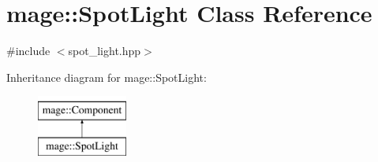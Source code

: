 \hypertarget{classmage_1_1_spot_light}{}\section{mage\+:\+:Spot\+Light Class Reference}
\label{classmage_1_1_spot_light}


{\ttfamily \#include $<$spot\+\_\+light.\+hpp$>$}

Inheritance diagram for mage\+:\+:Spot\+Light\+:\begin{figure}[H]
\begin{center}
\leavevmode
\includegraphics[height=2.000000cm]{classmage_1_1_spot_light}
\end{center}
\end{figure}
